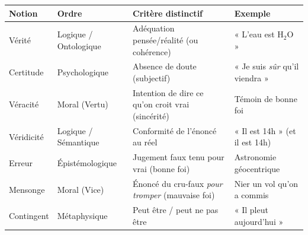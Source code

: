 \documentclass[11pt]{article}
\begin{document}
\begin{center}
\begin{tabularx}{\linewidth}{|l|X|X|X|}
\hline
\rowcolor{popblueL}
\textbf{Notion} & \textbf{Ordre} & \textbf{Critère distinctif} & \textbf{Exemple} \\
\hline
Vérité & Logique / Ontologique & Adéquation pensée/réalité (ou cohérence) & « L'eau est H$_2$O » \\
Certitude & Psychologique & Absence de doute (subjectif) & « Je suis \emph{sûr} qu'il viendra » \\
Véracité & Moral (Vertu) & Intention de dire ce qu'on croit vrai (sincérité) & Témoin de bonne foi \\
Véridicité & Logique / Sémantique & Conformité de l'énoncé au réel & « Il est 14h » (et il est 14h) \\
Erreur & Épistémologique & Jugement faux tenu pour vrai (bonne foi) & Astronomie géocentrique \\
Mensonge & Moral (Vice) & Énoncé du cru-faux \emph{pour tromper} (mauvaise foi) & Nier un vol qu'on a commis \\
Contingent & Métaphysique & Peut être / peut ne pas être & « Il pleut aujourd'hui » \\
\hline
\end{tabularx}
\end{center}
\end{document}
